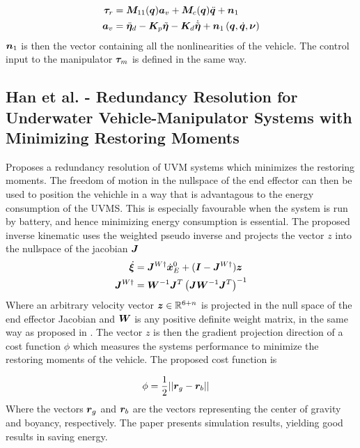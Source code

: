 \begin{align}
	\boldsymbol \tau_{r} & = \boldsymbol M_{11}(\boldsymbol q) \boldsymbol a_{v} + \boldsymbol M_{c}(\boldsymbol q) \ddot{\boldsymbol q} + \boldsymbol n_{1} \\
	\boldsymbol a_{v} &= \ddot{\boldsymbol \eta}_{d} - \boldsymbol K_{p} \tilde{\boldsymbol \eta} - \boldsymbol K_{d} \dot{\tilde{\boldsymbol \eta}} + \boldsymbol n_{1} \left( \boldsymbol q, \dot{\boldsymbol q},\boldsymbol \nu \right)
	\label{eq:fossenfbl}
\end{align}
$\boldsymbol n_{1}$ is then the vector containing all the nonlinearities of the vehicle. The control input to the manipulator $\boldsymbol \tau_{m}$ is defined in the same way. 



\subsection{Han et al. - 
Redundancy Resolution for Underwater Vehicle-Manipulator Systems
with Minimizing Restoring Moments }

\cite{redundancy_res_restoring_forces} Proposes a redundancy resolution of UVM systems which minimizes the restoring moments. The freedom of motion in the nullspace of the end effector can then be used to position the vehichle in a way that is advantagous to the energy consumption of the UVMS. This is especially favourable when the system is run by battery, and hence minimizing energy consumption is essential.
The proposed inverse kinematic uses the weighted pseudo inverse and projects the vector $z$ into the nullspace of the jacobian $\boldsymbol J$ 
\begin{align}
  \dot{\boldsymbol \xi}&=\boldsymbol J^{W \dagger} \dot{\boldsymbol x}_E^0+(\boldsymbol I- \boldsymbol J^{W \dagger})\boldsymbol z
  \label{eq:restoringforces_inverse}  \\
  \boldsymbol J^{W \dagger}&= \boldsymbol W^{-1} \boldsymbol J^T  \left( \boldsymbol J \boldsymbol W^{-1} \boldsymbol J^T \right) ^{-1}
  \label{eq:restoring_J}
\end{align}
Where an arbitrary velocity vector $\boldsymbol z\in \mathbb{R}^{6+n}$ is projected in the null space of the end effector Jacobian and $\boldsymbol W$ is any positive definite weight matrix, in the same way as proposed in \cite{antonelli1}. 
The vector $z$ is then the gradient projection direction of a cost function $\phi$ which measures the systems performance to minimize the restoring moments of the vehicle. The proposed cost function is

\begin{align}
	\phi &= \frac{1}{2} || \boldsymbol r_{g} - \boldsymbol r_{b} ||
	\label{eq:minimizingrestoring}
\end{align}
Where the vectors $\boldsymbol r_{g}$ and $\boldsymbol r_{b}$ are the vectors representing the center of gravity and boyancy, respectively. The paper presents simulation results, yielding good results in saving energy.







